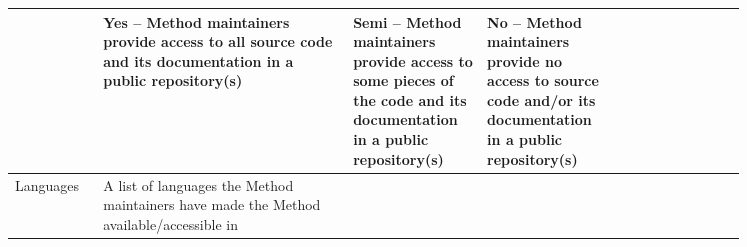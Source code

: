 \documentclass[sn-mathphys,Numbered]{sn-jnl}%
\theoremstyle{thmstyleone}%
\theoremstyle{thmstyletwo}%
\theoremstyle{thmstylethree}%
\begin{document}
\begin{table}
\begin{tiny}
\begin{tabular} {p{0.1\linewidth} | p{0.3\linewidth} | p{0.15\linewidth} | p{0.15\linewidth} | p{0.15\linewidth}}
 & Yes -- Method maintainers provide access to all source code and its documentation in a public repository(s)
 & Semi -- Method maintainers provide access to some pieces of the code and its documentation in a public repository(s)
 & No -- Method maintainers provide no access to source code and/or its documentation in a public repository(s)
 \\
 \hline
Languages
 & A list of languages the Method maintainers have made the Method available/accessible in
 & & & \\

\bottomrule
\end{tabular}
\end{tiny}
\vspace{1ex}
\begin{tiny}
{\raggedright
\par}
\end{tiny}
\end{table}
\end{document}
